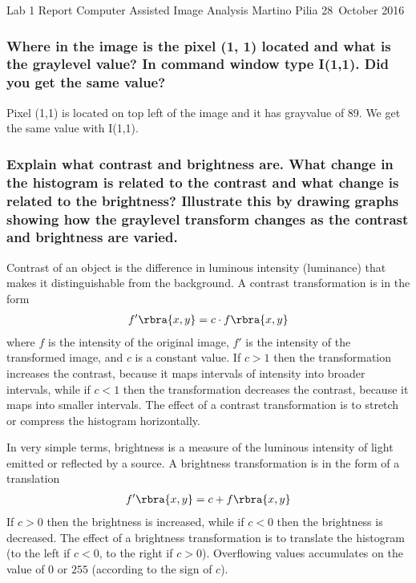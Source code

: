 \documentclass[a4paper]{article}
\begin{document}
\UppsalaTitlePage
    {Lab 1 Report}
    {Computer Assisted Image Analysis}
    {Martino Pilia}
    {28\th~October 2016}

\newpage

\subsubsection*{Where in the image is the pixel (1, 1) located and what is the
graylevel value? In command window type I(1,1). Did you get the same value?}

Pixel (1,1) is located on top left of the image and it has grayvalue of 89. We
get the same value with I(1,1).

\subsubsection*{Explain what contrast and brightness are. What change in the
    histogram is related to the contrast and what change is related to the
    brightness? Illustrate this by drawing graphs showing how the graylevel
    transform changes as the contrast and brightness are varied.}
Contrast of an object is the difference in luminous intensity (luminance) that
makes it distinguishable from the background. A contrast transformation is in
the form
\begin{align*}
    f'\rbra{x,y} = c \cdot f\rbra{x,y}
\end{align*}
where $f$ is the intensity of the original image, $f'$ is the intensity
of the transformed image, and $c$ is a constant value. If $c>1$ then the
transformation increases the contrast, because it maps intervals of intensity
into broader intervals, while if $c<1$ then the transformation decreases the
contrast, because it maps into smaller intervals.
The effect of a contrast transformation is to stretch or compress the histogram
horizontally.

In very simple terms, brightness is a measure of the luminous intensity of
light emitted or reflected by a source. A brightness transformation is in 
the form of a translation
\begin{align*}
    f'\rbra{x,y} = c + f\rbra{x,y}
\end{align*}
If $c > 0$ then the brightness is increased, while if $c < 0$ then the
brightness is decreased.
The effect of a brightness transformation is to translate the histogram (to the
left if $c < 0$, to the right if $c > 0$). Overflowing values accumulates on
the value of $0$ or $255$ (according to the sign of $c$).
\end{document}
